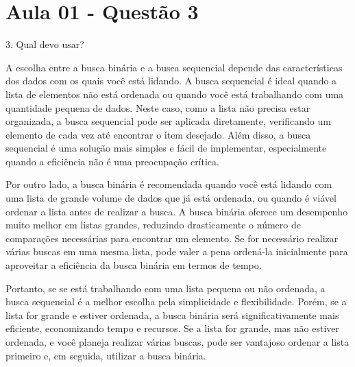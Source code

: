 \section{Aula 01 - Questão 3}

3. Qual devo usar?

A escolha entre a busca binária e a busca sequencial depende das características dos dados com os quais você está lidando. A busca sequencial é ideal quando a lista de elementos não está ordenada ou quando você está trabalhando com uma quantidade pequena de dados. Neste caso, como a lista não precisa estar organizada, a busca sequencial pode ser aplicada diretamente, verificando um elemento de cada vez até encontrar o item desejado. Além disso, a busca sequencial é uma solução mais simples e fácil de implementar, especialmente quando a eficiência não é uma preocupação crítica.

Por outro lado, a busca binária é recomendada quando você está lidando com uma lista de grande volume de dados que já está ordenada, ou quando é viável ordenar a lista antes de realizar a busca. A busca binária oferece um desempenho muito melhor em listas grandes, reduzindo drasticamente o número de comparações necessárias para encontrar um elemento. Se for necessário realizar várias buscas em uma mesma lista, pode valer a pena ordená-la inicialmente para aproveitar a eficiência da busca binária em termos de tempo.

Portanto, se se está trabalhando com uma lista pequena ou não ordenada, a busca sequencial é a melhor escolha pela simplicidade e flexibilidade. Porém, se a lista for grande e estiver ordenada, a busca binária será significativamente mais eficiente, economizando tempo e recursos. Se a lista for grande, mas não estiver ordenada, e você planeja realizar várias buscas, pode ser vantajoso ordenar a lista primeiro e, em seguida, utilizar a busca binária.
